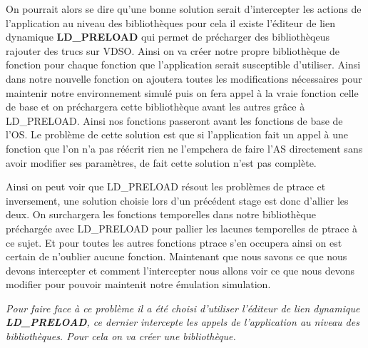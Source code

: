 On pourrait alors se dire qu'une bonne solution serait d'intercepter les actions
de l'application au niveau des bibliothèques pour cela il existe l'éditeur de
lien dynamique \textbf{LD\_PRELOAD} qui permet de précharger des bibliothèqeus{\color{red} rajouter des trucs sur
  VDSO}. Ainsi on va créer notre propre bibliothèque de fonction pour chaque
fonction que l'application serait susceptible d'utiliser. Ainsi dans notre
nouvelle fonction on ajoutera toutes les modifications nécessaires pour
maintenir notre environnement simulé puis on fera appel à la vraie fonction
celle de base et on préchargera cette bibliothèque avant les autres grâce à
LD\_PRELOAD. Ainsi nos fonctions passeront avant les fonctions de base de
l'OS. Le problème de cette solution est que si l'application fait un appel à une
fonction que l'on n'a pas réécrit rien ne l'empchera de faire l'AS directement
sans avoir modifier ses paramètres, de fait cette solution n'est pas
complète. 

Ainsi on peut voir que LD\_PRELOAD résout les problèmes de ptrace et
inversement, une solution choisie lors d'un précédent stage est donc d'allier
les deux. On surchargera les fonctions temporelles dans notre bibliothèque préchargée avec LD\_PRELOAD pour pallier les lacunes temporelles de ptrace à ce sujet. Et pour toutes les autres fonctions ptrace s'en occupera ainsi on est certain de n'oublier aucune fonction. Maintenant que nous savons ce que nous devons intercepter et comment
l'intercepter nous allons voir ce que nous devons modifier pour pouvoir
maintenit notre émulation simulation.

\textit{Pour faire face à ce problème il a été choisi d'utiliser l'éditeur de
  lien dynamique \textbf{LD\_PRELOAD}, ce dernier intercepte les appels de
  l'application au niveau des bibliothèques. Pour cela on va créer une
  bibliothèque.}

